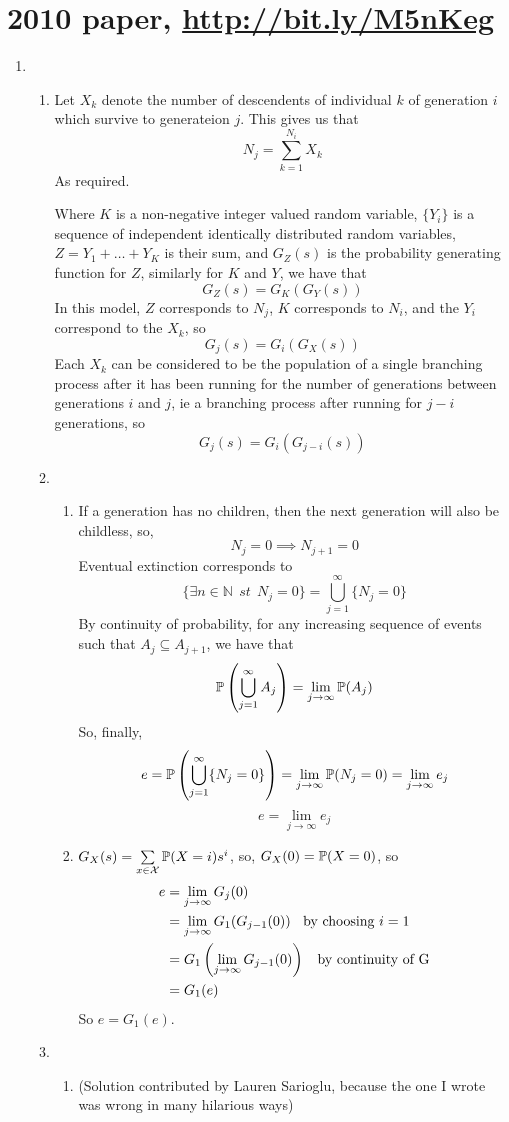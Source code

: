 \documentclass{article}
\begin{document}
\section*{2010 paper, \url{http://bit.ly/M5nKeg}}
\begin{enumerate}
\item
\begin{enumerate}
\item
Let $X_k$ denote the number of descendents of individual $k$ of generation $i$
which survive to generateion $j$. This gives us that
$$
N_j = \sum^{N_i}_{k=1}X_k
$$
As required.

Where $K$ is a non-negative integer valued random variable, $\{Y_i\}$ is a
sequence of independent identically distributed random variables,
$Z=Y_1+\dots+Y_K$ is their sum, and $G_Z(s)$ is the probability generating
function for $Z$, similarly for $K$ and $Y$, we have that
$$
G_Z(s) = G_K(G_Y(s))
$$
In this model, $Z$ corresponds to $N_j$, $K$ corresponds to $N_i$, and the $Y_i$
correspond to the $X_k$, so
$$
G_j(s) = G_i(G_X(s))
$$
Each $X_k$ can be considered to be the population of a single branching process
after it has been running for the number of generations between generations $i$
and $j$, ie a branching process after running for $j-i$ generations, so
$$
G_j(s) = G_i(G_{j-i}(s))
$$
\item 
\begin{enumerate}
\item
If a generation has no children, then the next generation will also be
childless, so,
$$
N_j=0 \implies N_{j+1}=0
$$
Eventual extinction corresponds to 
$$
\{\exists n \in \mathbb{N} \;\, st \;\, N_j=0\} = \bigcup^\infty_{j=1}\{N_j=0\}
$$
By continuity of probability, for any increasing sequence of events such that
$A_j \subseteq A_{j+1}$, we have that
$$
\mathbb{P}\left(\bigcup^\infty_{j=1}A_j\right) = \lim_{j\rightarrow\infty} \mathbb{P}(A_j)
$$
So, finally,
$$
e=\mathbb{P}\left(\bigcup^\infty_{j=1}\{N_j=0\}\right) = \lim_{j\rightarrow\infty}
\mathbb{P}(N_j=0) = \lim_{j\rightarrow\infty}e_j
$$
$$
e=\lim_{j\rightarrow\infty}e_j
$$
\item
$G_X(s) = \sum\limits_{x \in \mathcal{X}}\mathbb{P}(X=i)s^i$, so, $G_X(0) = \mathbb{P}(X=0)$,
so
\begin{align*}
e &= \lim_{j\rightarrow\infty}G_j(0)\\
&= \lim_{j\rightarrow\infty}G_1(G_{j-1}(0)) \mbox{\;\; by choosing $i=1$}\\
&= G_1\left(\lim_{j\rightarrow\infty}G_{j-1}(0)\right)\mbox{\;\; by continuity
of G}\\
&= G_1(e)
\end{align*}
So $e = G_1(e)$.
\end{enumerate}
\item
\begin{enumerate}
\item (Solution contributed by Lauren Sarioglu, because the one I wrote was wrong
 in many hilarious ways)


\end{enumerate}
\end{enumerate}
\end{enumerate}
\end{document}
